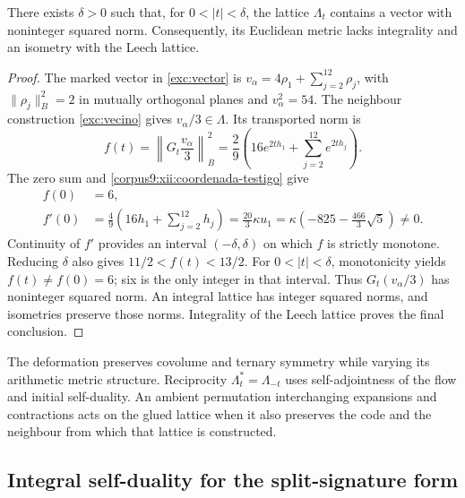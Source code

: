\begin{proposition}
\label{corpus9:xii:testigo-integralidad}
There exists \(\delta>0\) such that, for \(0<|t|<\delta\), the
lattice \(\Lambda_t\) contains a vector with noninteger squared norm.
Consequently, its Euclidean metric lacks integrality and an isometry
with the Leech lattice.
\end{proposition}
\begin{proof}
The marked vector in \eqref{exc:vector} is
\(v_\alpha=4\rho_1+\sum_{j=2}^{12}\rho_j\), with
\(\|\rho_j\|_B^2=2\) in mutually orthogonal planes and
\(v_\alpha^2=54\). The neighbour construction
\eqref{exc:vecino} gives \(v_\alpha/3\in\Lambda\). Its transported
norm is
\begin{equation}
 f(t)=\left\|G_t\frac{v_\alpha}{3}\right\|_B^2
 =\frac29\left(16e^{2th_1}+\sum_{j=2}^{12}e^{2th_j}\right).
 \label{corpus9:xii:norma-testigo}
\end{equation}
The zero sum and \eqref{corpus9:xii:coordenada-testigo} give
\begin{equation}
 \begin{aligned}
 f(0)&=6,\\
 f'(0)&=\frac49\left(16h_1+\sum_{j=2}^{12}h_j\right)
       =\frac{20}{3}\kappa u_1
       =\kappa\left(-825-\frac{466}{3}\sqrt5\right)\ne0.
 \end{aligned}
 \label{corpus9:xii:derivada-testigo}
\end{equation}
Continuity of \(f'\) provides an interval
\((-\delta,\delta)\) on which \(f\) is strictly monotone.
Reducing \(\delta\) also gives \(11/2<f(t)<13/2\). For
\(0<|t|<\delta\), monotonicity yields \(f(t)\ne f(0)=6\);
six is the only integer in that interval. Thus \(G_t(v_\alpha/3)\)
has noninteger squared norm. An integral lattice has integer squared
norms, and isometries preserve those norms. Integrality of the Leech
lattice proves the final conclusion.
\end{proof}

The deformation preserves covolume and ternary symmetry while varying
its arithmetic metric structure. Reciprocity
\(\Lambda_t^*=\Lambda_{-t}\) uses self-adjointness of the flow and
initial self-duality. An ambient permutation interchanging expansions
and contractions acts on the glued lattice when it also preserves the
code and the neighbour from which that lattice is constructed.

\subsection{Integral self-duality for the split-signature form}
\label{corpus9:xii:autodualidad-partida}

